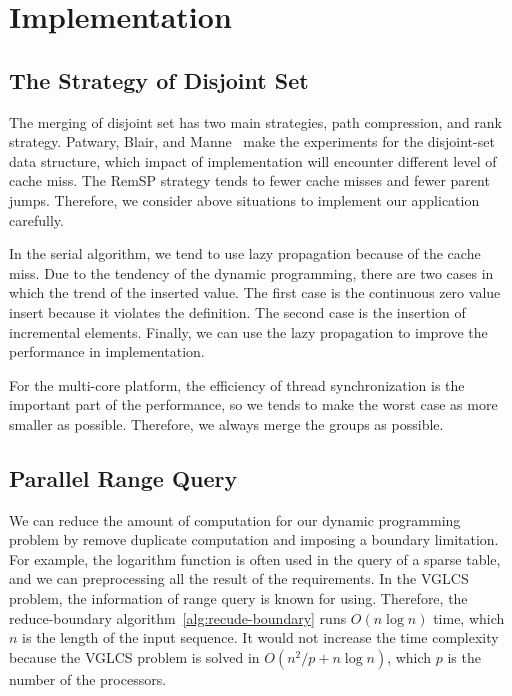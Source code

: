 \section{Implementation}
\label{sec:Implementation}

\subsection{The Strategy of Disjoint Set}

The merging of disjoint set has two main strategies, path compression,
and rank strategy.  Patwary, Blair, and
Manne~\cite{Patwary2010ExperimentsOU} make the experiments for the
disjoint-set data structure, which impact of implementation will
encounter different level of cache miss. The {\textrm RemSP} strategy
tends to fewer cache misses and fewer parent jumps.  Therefore, we
consider above situations to implement our application carefully.

\iffalse
運行 VGLCS 時，將耗費 $\theta(n^2)$ 的內存空間。使用遞增後綴最大值 (ISMQ) 時，
採用並查集實作將會遭遇到很多不平衡的工作負載，其原因在於合併的策略，
常見的有路徑壓縮和啟發式合併兩種策略，這間接影響到不同次數的分枝判斷。
實務上須考慮到快取未中
\fi

In the serial algorithm, we tend to use lazy propagation because of the
cache miss.  Due to the tendency of the dynamic programming, there are
two cases in which the trend of the inserted value.  The first case is
the continuous zero value insert because it violates the definition.
The second case is the insertion of incremental elements.  Finally, we
can use the lazy propagation to improve the performance in
implementation.

For the multi-core platform, the efficiency of thread synchronization is
the important part of the performance, so we tends to make the worst
case as more smaller as possible.  Therefore, we always merge the groups
as possible.

\iffalse
每個執行緒負責數個完整的并查集，操作時應偏向延遲標記操作，
儘早合併的策略易造成快取未中。由於動態規劃的傾向中，插入值的趨勢有兩種情況，
其一為連續不合定義的零元素插入，其二為遞增元素的插入，在這兩者穿插的趨勢中，
我們發現延遲操作將會帶來較能改善快取未中問題。
\fi

\subsection{Parallel Range Query}

We can reduce the amount of computation for our dynamic programming
problem by remove duplicate computation and imposing a boundary
limitation.  For example, the logarithm function is often used in the
query of a sparse table, and we can preprocessing all the result of the
requirements.  In the VGLCS problem, the information of range query is
known for using.  Therefore, the reduce-boundary 
algorithm~\ref{alg:recude-boundary} runs $O(n \log n)$ time, which $n$ 
is the length of the input sequence.  It would not increase the time 
complexity because the VGLCS problem is solved in 
$O(n^2 / p + n \log n)$, which $p$ is the number of the processors.


